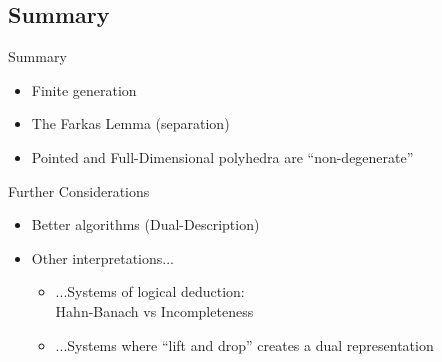 \documentclass{beamer}
\begin{document}
\subsection{Summary}

\begin{frame}{Summary}
	\begin{itemize}
		\item<1-> Finite generation
		\item<2-> The Farkas Lemma (separation)
    \item<3-> Pointed and Full-Dimensional polyhedra are ``non-degenerate''
	\end{itemize}
\end{frame}

\begin{frame}{Further Considerations}
\begin{itemize}
  \item Better algorithms (Dual-Description)
  \item Other interpretations...
  \begin{itemize}
    \item ...Systems of logical deduction: \\
      Hahn-Banach vs Incompleteness
    \item ...Systems where ``lift and drop'' creates a dual representation
  \end{itemize}
\end{itemize}
\end{frame}


%
%
%


%
%
%
%
%
\end{document}
